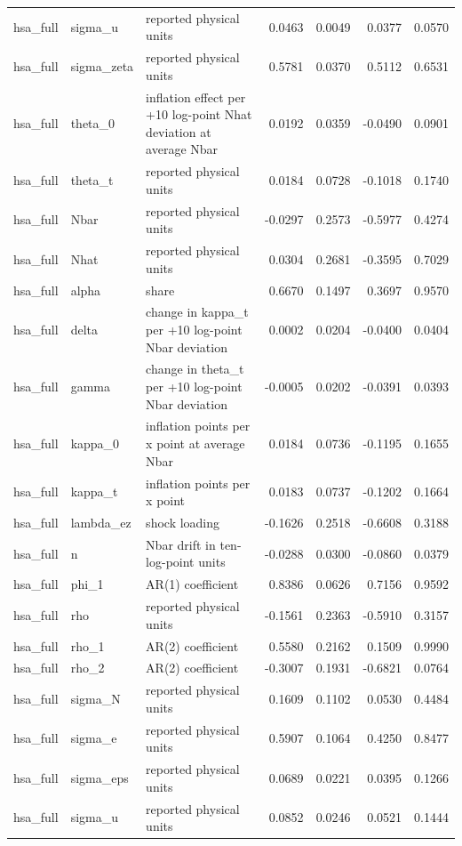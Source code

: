 \begin{tabular}{lllrrrr}
hsa\_full & sigma\_u & reported physical units & 0.0463 & 0.0049 & 0.0377 & 0.0570 \\
hsa\_full & sigma\_zeta & reported physical units & 0.5781 & 0.0370 & 0.5112 & 0.6531 \\
hsa\_full & theta\_0 & inflation effect per +10 log-point Nhat deviation at average Nbar & 0.0192 & 0.0359 & -0.0490 & 0.0901 \\
hsa\_full & theta\_t & reported physical units & 0.0184 & 0.0728 & -0.1018 & 0.1740 \\
hsa\_full & Nbar & reported physical units & -0.0297 & 0.2573 & -0.5977 & 0.4274 \\
hsa\_full & Nhat & reported physical units & 0.0304 & 0.2681 & -0.3595 & 0.7029 \\
hsa\_full & alpha & share & 0.6670 & 0.1497 & 0.3697 & 0.9570 \\
hsa\_full & delta & change in kappa\_t per +10 log-point Nbar deviation & 0.0002 & 0.0204 & -0.0400 & 0.0404 \\
hsa\_full & gamma & change in theta\_t per +10 log-point Nbar deviation & -0.0005 & 0.0202 & -0.0391 & 0.0393 \\
hsa\_full & kappa\_0 & inflation points per x point at average Nbar & 0.0184 & 0.0736 & -0.1195 & 0.1655 \\
hsa\_full & kappa\_t & inflation points per x point & 0.0183 & 0.0737 & -0.1202 & 0.1664 \\
hsa\_full & lambda\_ez & shock loading & -0.1626 & 0.2518 & -0.6608 & 0.3188 \\
hsa\_full & n & Nbar drift in ten-log-point units & -0.0288 & 0.0300 & -0.0860 & 0.0379 \\
hsa\_full & phi\_1 & AR(1) coefficient & 0.8386 & 0.0626 & 0.7156 & 0.9592 \\
hsa\_full & rho & reported physical units & -0.1561 & 0.2363 & -0.5910 & 0.3157 \\
hsa\_full & rho\_1 & AR(2) coefficient & 0.5580 & 0.2162 & 0.1509 & 0.9990 \\
hsa\_full & rho\_2 & AR(2) coefficient & -0.3007 & 0.1931 & -0.6821 & 0.0764 \\
hsa\_full & sigma\_N & reported physical units & 0.1609 & 0.1102 & 0.0530 & 0.4484 \\
hsa\_full & sigma\_e & reported physical units & 0.5907 & 0.1064 & 0.4250 & 0.8477 \\
hsa\_full & sigma\_eps & reported physical units & 0.0689 & 0.0221 & 0.0395 & 0.1266 \\
hsa\_full & sigma\_u & reported physical units & 0.0852 & 0.0246 & 0.0521 & 0.1444 \\

\end{tabular}
